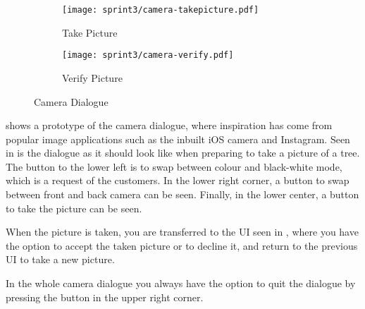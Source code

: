 \begin{figure}[h]
     \centering
     \begin{subfigure}{0.45\textwidth}
          \texttt{[image: sprint3/camera-takepicture.pdf]}
          \caption{Take Picture}
          \label{fig:cam-takepic}
     \end{subfigure}      
     \begin{subfigure}{0.45\textwidth}
          \texttt{[image: sprint3/camera-verify.pdf]}
          \caption{Verify Picture}
          \label{fig:cam-verifypic}
     \end{subfigure}
     \caption{Camera Dialogue}
     \label{fig:cam-dialogue}
\end{figure}

 shows a prototype of the camera dialogue, where inspiration has come from popular image applications such as the inbuilt iOS camera and Instagram.
Seen in  is the dialogue as it should look like when preparing to take a picture of a tree.
The button to the lower left is to swap between colour and black-white mode, which is a request of the customers.
In the lower right corner, a button to swap between front and back camera can be seen.
Finally, in the lower center, a button to take the picture can be seen.

When the picture is taken, you are transferred to the UI seen in , where you have the option to accept the taken picture or to decline it, and return to the previous UI to take a new picture.

In the whole camera dialogue you always have the option to quit the dialogue by pressing the button in the upper right corner.